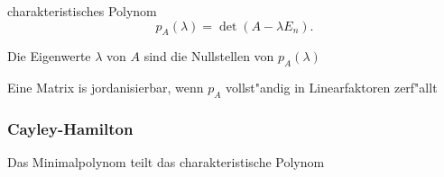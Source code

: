 \documentclass[class=article, crop=false]{standalone}
\begin{document}
\begin{zettel}{charakteristisches Polynom}
\[
    p_{A}(\lambda ) = \det(A - \lambda E_{n})
.\]

Die Eigenwerte $\lambda$ von $A$ sind die Nullstellen von $p_{A}(\lambda)$ 

Eine Matrix is jordanisierbar, wenn $p_{A}$ vollst"andig in Linearfaktoren zerf"allt

\subsubsection{Cayley-Hamilton}
Das Minimalpolynom teilt das charakteristische Polynom

\end{zettel}
\end{document}
